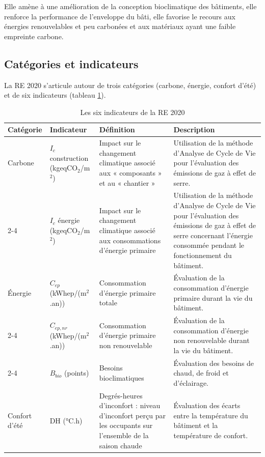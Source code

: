 Elle amène à une amélioration de la conception bioclimatique des bâtiments, elle renforce la performance de l'enveloppe du bâti, elle favorise le recours aux énergies renouvelables et peu carbonées et aux matériaux ayant une faible empreinte carbone.

\subsection*{Catégories et indicateurs}
La RE 2020 s'articule autour de trois catégories (carbone, énergie, confort d'été) et de six indicateurs (tableau \ref{tab:re2020-indicateurs}).

\begin{table}[htbp]
\centering
\caption{Les six indicateurs de la RE 2020}
\label{tab:re2020-indicateurs}
\small
\renewcommand{\arraystretch}{1.25}
\begin{tabular}{p{1.6cm}p{2.6cm}p{3.8cm}p{6cm}}
\hline
\textbf{Catégorie} & \textbf{Indicateur} & \textbf{Définition} & \textbf{Description} \\
\hline
Carbone & $I_c$ construction (kgeqCO$_2$/m$^2$) & Impact sur le changement climatique associé aux « composants » et au « chantier » & Utilisation de la méthode d'Analyse de Cycle de Vie pour l'évaluation des émissions de gaz à effet de serre. \\
\cline{2-4}
 & $I_c$ énergie (kgeqCO$_2$/m$^2$) & Impact sur le changement climatique associé aux consommations d'énergie primaire & Utilisation de la méthode d'Analyse de Cycle de Vie pour l'évaluation des émissions de gaz à effet de serre concernant l'énergie consommée pendant le fonctionnement du bâtiment. \\
\hline
Énergie & $C_{ep}$ (kWhep/(m$^2$.an)) & Consommation d'énergie primaire totale & Évaluation de la consommation d'énergie primaire durant la vie du bâtiment. \\
\cline{2-4}
 & $C_{ep,nr}$ (kWhep/(m$^2$.an)) &Consommation d'énergie primaire non renouvelable &  Évaluation de la consommation d'énergie non renouvelable durant la vie du bâtiment. \\
\cline{2-4}
 & $B_{bio}$ (points) & Besoins bioclimatiques & Évaluation des besoins de chaud, de froid et d'éclairage. \\
\hline
Confort d'été & DH (°C.h) & Degrés-heures d'inconfort : niveau d'inconfort perçu par les occupants sur l'ensemble de la saison chaude & Évaluation des écarts entre la température du bâtiment et la température de confort. \\
\hline
\end{tabular}
\end{table}

